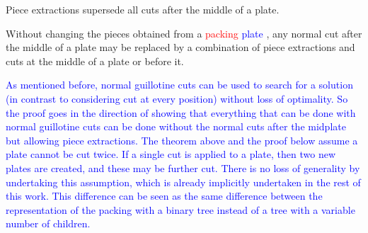\documentclass[ppgc,tese,english,formais,babel]{iiufrgs}
\newif\iffinalversion
\newcommand{\newtext}[1]{\iffinalversion%
#1%
\else%
\textcolor{blue}{#1}%
\fi%
}
\newcommand{\oldtext}[1]{\iffinalversion%
\else%
\textcolor{red}{#1}%
\fi%
}
\begin{document}
\begin{theorem}{Piece extractions supersede all cuts after the middle of a plate.}

Without changing the pieces obtained from a \oldtext{packing}\newtext{plate}, any normal cut after the middle of a plate may be replaced by a combination of piece extractions and cuts at the middle of a plate or before it.
\label{the:enhanced_correctness}
\end{theorem}

\newtext{
As mentioned before, normal guillotine cuts can be used to search for a solution (in contrast to considering cut at every position) without loss of optimality.
So the proof goes in the direction of showing that everything that can be done with normal guillotine cuts can be done without the normal cuts after the midplate but allowing piece extractions.
The theorem above and the proof below assume a plate cannot be cut twice.
If a single cut is applied to a plate, then two new plates are created, and these may be further cut.
There is no loss of generality by undertaking this assumption, which is already implicitly undertaken in the rest of this work.
This difference can be seen as the same difference between the representation of the packing with a binary tree instead of a tree with a variable number of children.
}
\end{document}
